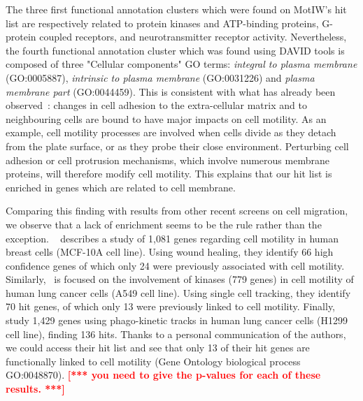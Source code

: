 The three first functional annotation clusters which were found on
MotIW's hit list are respectively related to protein kinases and
ATP-binding proteins, G-protein coupled receptors, and
neurotransmitter receptor activity. Nevertheless, the fourth
functional annotation cluster which was found using DAVID tools is
composed of three "Cellular components" GO terms: \textit{integral to
  plasma membrane} (GO:0005887), \textit{intrinsic to plasma membrane}
(GO:0031226) and \textit{plasma membrane part} (GO:0044459). This is
consistent with what has already been observed~\cite{pmid18213366}:
changes in cell adhesion to the extra-cellular matrix and to
neighbouring cells are bound to have major impacts on cell
motility. As an example, cell motility processes are involved when
cells divide as they detach from the plate surface, or as they probe
their close environment. Perturbing cell adhesion or cell protrusion
mechanisms, which involve numerous membrane proteins, will therefore
modify cell motility. This explains that our hit list is enriched in
genes which are related to cell membrane. 

%

Comparing this finding with results from other recent screens on cell
migration, we observe that a lack of enrichment seems to be the rule
rather than the exception. ~\cite{pmid19160483} describes
a study of 1,081 genes regarding cell motility in human breast cells
(MCF-10A cell line). Using wound healing, they identify 66 high
confidence genes of which only 24 were previously associated with cell
motility. Similarly,~\cite{pmid21423205} is focused on the involvement
of kinases (779 genes) in cell motility of human lung cancer cells
(A549 cell line). Using single cell tracking, they identify 70 hit
genes, of which only 13 were previously linked to cell
motility. Finally,~\cite{pmid25774502} study 1,429 genes using
phago-kinetic tracks in human lung cancer cells (H1299 cell line),
finding 136 hits. Thanks to a personal communication of the authors,
we could access their hit list and see that only 13 of their hit genes
are functionally linked to cell motility (Gene Ontology biological
process GO:0048870). \textcolor{red}{\bf [*** you need to give the
  p-values for each of these results. ***]}

